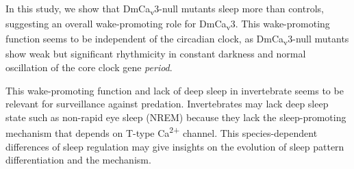 In this study, we show that DmCa\textsubscript{v}3-null mutants sleep more than controls, suggesting an overall wake-promoting role for DmCa\textsubscript{v}3.
This wake-promoting function seems to be independent of the circadian clock, as DmCa\textsubscript{v}3-null mutants show weak but significant rhythmicity in constant darkness and normal oscillation of the core clock gene \emph{period}.

This wake-promoting function and lack of deep sleep in invertebrate seems to be relevant for surveillance against predation.
Invertebrates may lack deep sleep state such as non-rapid eye sleep (NREM) because they lack the sleep-promoting mechanism that depends on T-type Ca\textsuperscript{2+} channel.
This species-dependent differences of sleep regulation may give insights on the evolution of sleep pattern differentiation and the mechanism.
